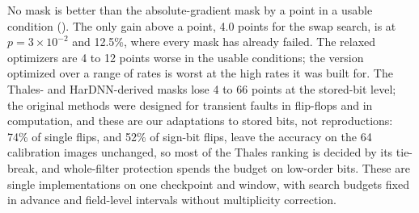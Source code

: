 No mask is better than the absolute-gradient mask by a point in a usable condition (). The only gain above a point, 4.0 points for the swap search, is at $p=3\times10^{-2}$ and 12.5\%, where every mask has already failed. The relaxed optimizers are 4 to 12 points worse in the usable conditions; the version optimized over a range of rates is worst at the high rates it was built for. The Thales- and HarDNN-derived masks lose 4 to 66 points at the stored-bit level; the original methods were designed for transient faults in flip-flops and in computation, and these are our adaptations to stored bits, not reproductions: 74\% of single flips, and 52\% of sign-bit flips, leave the accuracy on the 64 calibration images unchanged, so most of the Thales ranking is decided by its tie-break, and whole-filter protection spends the budget on low-order bits. These are single implementations on one checkpoint and window, with search budgets fixed in advance and field-level intervals without multiplicity correction.
